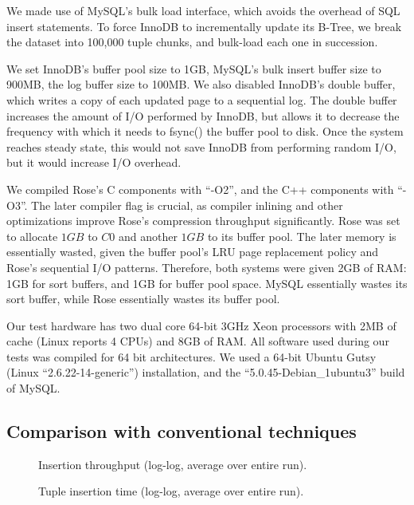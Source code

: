 \documentclass{vldb}
\newcommand{\rows}{Rose\xspace}
\newcommand{\rowss}{Rose's\xspace}
\begin{document}
We made use of MySQL's bulk load interface, which avoids the overhead of SQL insert
statements.  To force InnoDB to incrementally update its B-Tree, we
break the dataset into 100,000 tuple chunks, and bulk-load each one in
succession.


We set InnoDB's buffer pool size to 1GB, MySQL's bulk insert buffer
size to 900MB, the log buffer size to 100MB.  We also disabled InnoDB's
double buffer, which writes a copy of each updated page
to a sequential log.  The double buffer increases the amount of I/O
performed by InnoDB, but allows it to decrease the frequency with
which it needs to fsync() the buffer pool to disk.  Once the system
reaches steady state, this would not save InnoDB from performing
random I/O, but it would increase I/O overhead.

We compiled \rowss C components with ``-O2'', and the C++ components
with ``-O3''.  The later compiler flag is crucial, as compiler
inlining and other optimizations improve \rowss compression throughput
significantly.  \rows was set to allocate $1GB$ to $C0$ and another
$1GB$ to its buffer pool.  The later memory is essentially wasted,
given the buffer pool's LRU page replacement policy and \rowss
sequential I/O patterns.  Therefore, both systems were given 2GB of
RAM: 1GB for sort buffers, and 1GB for buffer pool space.  MySQL
essentially wastes its sort buffer, while \rows essentially wastes its
buffer pool.

Our test hardware has two dual core 64-bit 3GHz Xeon processors with
2MB of cache (Linux reports 4 CPUs) and 8GB of RAM.  All software used during our tests
was compiled for 64 bit architectures.  We used a 64-bit Ubuntu Gutsy
(Linux ``2.6.22-14-generic'') installation, and the
``5.0.45-Debian\_1ubuntu3'' build of MySQL.

\subsection{Comparison with conventional techniques}

\begin{figure}
\centering {}
\caption{Insertion throughput (log-log, average over entire run).}
\label{fig:avg-thru}
\end{figure}
\begin{figure}
\centering
{}
\caption{Tuple insertion time (log-log, average over entire run).}
\label{fig:avg-tup}
\end{figure}
\end{document}
